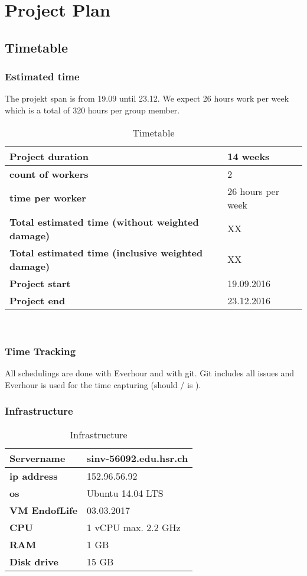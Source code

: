 \chapter{Project Plan}
\section{Timetable}
\subsection{Estimated time}
The projekt span is from 19.09 until 23.12. We expect 26 hours work per week which is a total of
320 hours per group member.

\begin{table}[H]
  \centering
  \scriptsize
  \caption{Timetable}
  \begin{tabular}{|p{80mm}|p{15mm}|}
    \hline 	\bf Project duration & 14 weeks \\ \hline
	\bf count of workers & 2 \\ \hline
	\bf time per worker & 26 hours per week \\ \hline
	\bf Total estimated time (without weighted damage) & XX \\ \hline
	\bf Total estimated time (inclusive weighted damage) & XX \\ \hline
	\bf Project start & 19.09.2016 \\ \hline
	\bf Project end & 23.12.2016 \\ \hline
  \end{tabular} \\
\end{table}

\subsection{Time Tracking}
All schedulings are done with Everhour and with git. Git includes all issues and Everhour is used for the time capturing (should / is ).

\subsection{Infrastructure}
\begin{table}[H]
  \centering
  \scriptsize
  \caption{Infrastructure}
  \begin{tabular}{|p{25mm}|p{30mm}|}
    \hline 	\bf Servername & sinv-56092.edu.hsr.ch \\ \hline
	\bf ip address & 152.96.56.92 \\ \hline
	\bf os & Ubuntu 14.04 LTS \\ \hline
	\bf VM EndofLife & 03.03.2017 \\ \hline
	\bf CPU & 1 vCPU max. 2.2 GHz \\ \hline
	\bf RAM & 1 GB \\ \hline
	\bf Disk drive & 15 GB \\ \hline
  \end{tabular} \\
\end{table}

